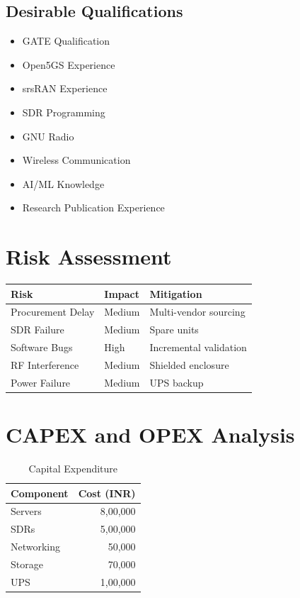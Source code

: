 \documentclass[12pt,a4paper]{article}
\begin{document}
\subsection{Desirable Qualifications}

\begin{itemize}
	\item GATE Qualification
	\item Open5GS Experience
	\item srsRAN Experience
	\item SDR Programming
	\item GNU Radio
	\item Wireless Communication
	\item AI/ML Knowledge
	\item Research Publication Experience
\end{itemize}


\section{Risk Assessment}
\begin{longtable}{|p{4cm}|p{3cm}|p{6cm}|}
	\hline
	Risk & Impact & Mitigation \\
	\hline
	Procurement Delay & Medium & Multi-vendor sourcing \\
	SDR Failure & Medium & Spare units \\
	Software Bugs & High & Incremental validation \\
	RF Interference & Medium & Shielded enclosure \\
	Power Failure & Medium & UPS backup \\
	\hline
\end{longtable}

\section{CAPEX and OPEX Analysis}
\begin{table}[h]
	\centering
	\caption{Capital Expenditure}
	\begin{tabular}{|l|r|}
		\hline
		Component & Cost (INR) \\
		\hline
		Servers & 8,00,000 \\
		SDRs & 5,00,000 \\
		Networking & 50,000 \\
		Storage & 70,000 \\
		UPS & 1,00,000 \\
		\hline
	\end{tabular}
\end{table}
\end{document}
